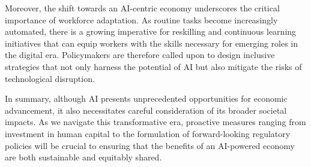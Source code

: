 Moreover, the shift towards an AI-centric economy underscores the critical importance of workforce adaptation. 
As routine tasks become increasingly automated, there is a growing imperative for reskilling and continuous learning initiatives that can equip workers with the skills 
necessary for emerging roles in the digital era. Policymakers are therefore called upon to design inclusive strategies that not only harness the potential 
of AI but also mitigate the risks of technological disruption.

In summary, although AI presents unprecedented opportunities for economic advancement, 
it also necessitates careful consideration of its broader societal impacts. As we navigate this transformative era, 
proactive measures ranging from investment in human capital to the formulation of forward-looking regulatory policies 
will be crucial to ensuring that the benefits of an AI-powered economy are both sustainable and equitably shared.
